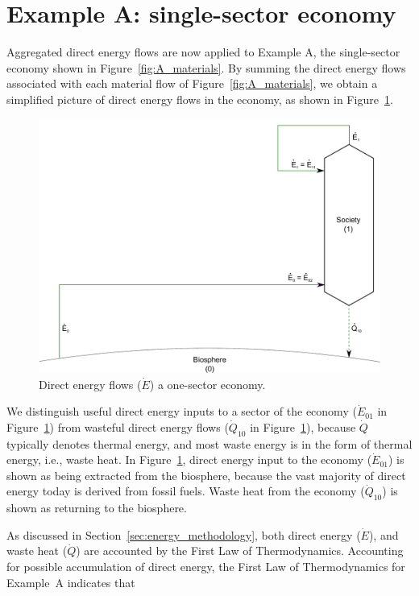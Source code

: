 \section{Example A: single-sector economy} %
\label{sec:A_energy}

Aggregated direct energy flows are now applied to Example A, 
the single-sector economy shown in Figure~\ref{fig:A_materials}.
By summing the direct energy flows associated with
each material flow of Figure~\ref{fig:A_materials}, we obtain
a simplified picture of direct energy flows in the economy,
as shown in Figure~\ref{fig:A_energy}.

\begin{figure}[!ht]
\centering
\includegraphics[width=0.8\linewidth]{Part_1/Chapter_Energy/images/1_sector_direct_energy.pdf}
\caption[Direct energy flows a one-sector economy]{Direct energy flows ($\dot{E}$) a one-sector economy.}
\label{fig:A_energy}
\end{figure}

We distinguish useful direct energy inputs to a sector of the economy
($\dot{E}_{01}$ in Figure~\ref{fig:A_energy}) from wasteful direct energy flows 
($\dot{Q}_{10}$ in Figure~\ref{fig:A_energy}), 
because $\dot{Q}$ typically denotes thermal energy, 
and most waste energy is in the form of thermal
energy, i.e., waste heat. In Figure~\ref{fig:A_energy}, direct energy input to the 
economy ($\dot{E}_{01}$) is shown as being extracted from the biosphere, because
the vast majority of direct energy today is derived from fossil fuels.
Waste heat from the economy ($\dot{Q}_{10}$) is shown as returning 
to the biosphere.

As discussed in Section~\ref{sec:energy_methodology}, 
both direct energy ($\dot{E}$), and waste heat ($\dot{Q}$) 
are accounted by the First Law of Thermodynamics. 
Accounting for possible accumulation of direct energy, 
the First Law of Thermodynamics for Example~A indicates that

